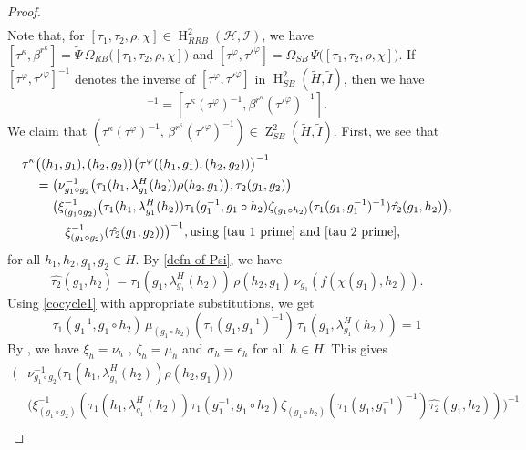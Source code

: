 \documentclass{jonasart}
\theoremstyle{plain}
\DeclareMathOperator{\Ho}{H}
\DeclareMathOperator{\Z}{Z}
\begin{document}
\begin{proof}
\begin{eqnarray}
		\end{eqnarray}
		Note that, for $[\tau_1,\tau_2,\rho,\chi]\in \Ho^2_{RRB}(\mathcal{H},\mathcal{I})$, we have $[\tau^\kappa,\beta^{r^\kappa}]=\widetilde{\Psi} \, \Omega_{RB}\big ([\tau_1,\tau_2,\rho,\chi]\big)$ and $[\tau^\varphi,\tau'^\varphi]=\Omega_{SB} \, \Psi \big([\tau_1,\tau_2,\rho,\chi]\big)$. If $[\tau^\varphi,\tau'^\varphi]^{-1}$ denotes the inverse of $[\tau^\varphi,\tau'^\varphi]$ in $\Ho^2_{SB}(\widetilde{H},\widetilde{I})$, then we have
		\begin{equation}
			[\tau^\kappa,\beta^{r^\kappa}][\tau^\varphi,\tau'^\varphi]^{-1}=[\tau^\kappa( \tau^\varphi)^{-1},\beta^{r^\kappa} (\tau'^\varphi)^{-1}].
		\end{equation}
		We claim that $(\tau^\kappa( \tau^\varphi)^{-1},\, \beta^{r^\kappa} (\tau'^\varphi)^{-1}) \in \Z_{SB}^2(\widetilde{H},\widetilde{I})$.  First, we see that
		\begin{align*}
			\tau^\kappa & \big((h_1,g_1),(h_2,g_2)\big) \big(\tau^\varphi((h_1,g_1),(h_2,g_2))\big)^{-1}\\
			&=\big(\nu^{-1}_{g_1\circ g_2}\big(\tau_1(h_1,\lambda^H_{g_1}(h_2))\rho(h_2,g_1)\big),\tau_2(g_1,g_2)\big)\\
			&\quad\ \big(\xi^{-1}_{(g_1\circ g_2)} \big(\tau_1(h_1,\lambda^H_{g_1}(h_2))\tau_1(g_1^{-1},g_1\circ h_2)\zeta_{(g_1\circ h_2)}(\tau_1(g_1,g_1^{-1})^{-1})\hat{\tau_2}(g_1, h_2)\big),\\
			&\qquad\ \xi^{-1}_{(g_1\circ g_2)}(\hat{\tau_2}(g_1,g_2))\big)^{-1}, \text{using \eqref{tau 1 prime} and \eqref{tau 2 prime},}
		\end{align*}
		for all $h_1, h_2, g_1, g_2 \in H$. By \eqref{defn of Psi}, we have
		\begin{equation}\label{boundary eq 1}
			\hat{\tau_2}(g_1, h_2)=\tau_1(g_1,\lambda^H_{g_1}(h_2))\, \rho(h_2,g_1)\, \nu_{g_1}(f(\chi(g_1),h_2)).
		\end{equation}
		Using \eqref{cocycle1} with appropriate substitutions, we get
		\begin{equation}\label{boundary eq 2}
			\tau_1(g_1^{-1},g_1\circ h_2)\, \mu_{(g_1\circ h_2)}(\tau_1(g_1,g_1^{-1})^{-1}) \, \tau_1(g_1,\lambda^H_{g_1}(h_2))=1
		\end{equation}
		By \cite[Corollary 4.2 and Proposition 4.3]{MR4819014}, we have $\xi_h=\nu_h$ , $\zeta_h=\mu_h $ and  $\sigma_h=\epsilon_h$ for all $h\in H$. This gives
		\begin{align*}
			\big(&\nu^{-1}_{g_1\circ g_2}\big(\tau_1(h_1,\lambda^H_{g_1}(h_2))\rho(h_2,g_1)\big)\big)\\ &\big(\xi^{-1}_{(g_1\circ g_2)}(\tau_1(h_1,\lambda^H_{g_1}(h_2))\tau_1(g_1^{-1},g_1\circ h_2)	\zeta_{(g_1\circ h_2)}(\tau_1(g_1,g_1^{-1})^{-1})	\hat{\tau_2}(g_1, h_2)) \big)^{-1} \\

\end{align*}
\end{proof}
\end{document}
